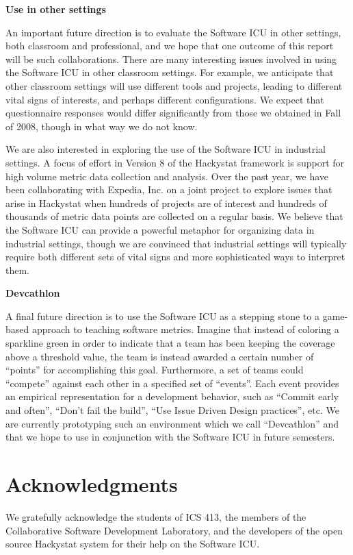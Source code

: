 \documentclass{acm_proc_article-sp}
\begin{document}
{\bf Use in other settings}

An important future direction is to evaluate the Software ICU in other
settings, both classroom and professional, and we hope that one outcome of
this report will be such collaborations.  There are many interesting issues
involved in using the Software ICU in other classroom settings. For
example, we anticipate that other classroom settings will use different
tools and projects, leading to different vital signs of interests, and
perhaps different configurations.  We expect that questionnaire
responses would differ significantly from those we obtained in Fall of
2008, though in what way we do not know.

We are also interested in exploring the use of the Software ICU in
industrial settings.  A focus of effort in Version 8 of the Hackystat
framework is support for high volume metric data collection and
analysis.  Over the past year, we have been collaborating with Expedia,
Inc. on a joint project to explore issues that arise in Hackystat when
hundreds of projects are of interest and hundreds of thousands of metric
data points are collected on a regular basis.  We believe that the Software
ICU can provide a powerful metaphor for organizing data in industrial
settings, though we are convinced that industrial settings will typically
require both different sets of vital signs and more sophisticated ways to
interpret them.

{\bf Devcathlon}

A final future direction is to use the Software ICU as a stepping stone to
a game-based approach to teaching software metrics.  Imagine that instead
of coloring a sparkline green in order to indicate that a team has been
keeping the coverage above a threshold value, the team is instead awarded
a certain number of ``points'' for accomplishing this goal.  Furthermore,
a set of teams could ``compete'' against each other in a specified set of
``events''.  Each event provides an empirical representation for a
development behavior, such as ``Commit early and often'', ``Don't fail the
build'', ``Use Issue Driven Design practices'', etc.  We are currently
prototyping such an environment which we call ``Devcathlon'' and that we
hope to use in conjunction with the Software ICU in future semesters.

\section{Acknowledgments}

We gratefully acknowledge the students of ICS 413, the members of the Collaborative Software Development Laboratory, and
the developers of the open source Hackystat system for their help on the Software ICU.


  
\end{document}
